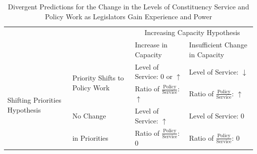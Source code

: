 \documentclass[12pt]{article}
\begin{document}
\renewcommand{\arraystretch}{1.2}%

\begin{table}[h]

\caption{Divergent Predictions for the Change in the Levels of Constituency Service and Policy Work as Legislators Gain Experience and Power}\label{t:theory}

\begin{tabular}[t]{p{.12\linewidth}|p{.18\linewidth}|p{.25\linewidth}|p{.25\linewidth}|}

\multicolumn{2}{l}{\multirow{2}{*}{}} & \multicolumn{2}{c}{Increasing Capacity Hypothesis} \\ \cline{3-4}

\multicolumn{2}{l|}{}    &  Increase in Capacity  &   Insufficient Change in Capacity \\ \cline{2-4} 

\multirow{4}{2cm}{Shifting Priorities Hypothesis}  &   \multirow{2}{3cm}{Priority Shifts to Policy Work}   &  Level of Service: 0 or $\uparrow$  &  Level of Service: $\downarrow$  \\ 

& &  Ratio of $\frac{\textrm{Policy}}{\textrm{Service}}$: $\uparrow$   &   Ratio of $\frac{\textrm{Policy}}{\textrm{Service}}$: $\uparrow$  \\ \cline{2-4}

 &  No Change    &  Level of Service: $\uparrow$  & Level of Service: $0$ \\ 

 & in Priorities &   Ratio of $\frac{\textrm{Policy}}{\textrm{Service}}$: $0$  & Ratio of $\frac{\textrm{Policy}}{\textrm{Service}}$: $0$\\ \cline{2-4}

\end{tabular}

\end{table}


\renewcommand{\arraystretch}{1}%
\end{document}
